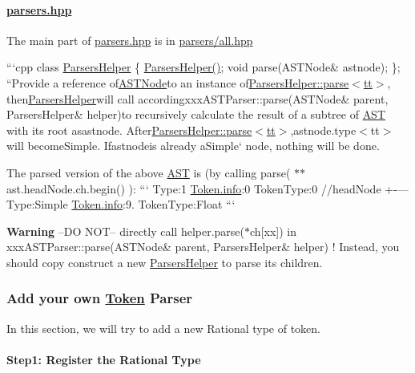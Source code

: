 \paragraph*{\hyperlink{parsers_8hpp}{parsers.\+hpp}}

The main part of {\ttfamily \hyperlink{parsers_8hpp}{parsers.\+hpp}} is in {\ttfamily \hyperlink{parsers_2all_8hpp}{parsers/all.\+hpp}}

```cpp class \hyperlink{class_parsers_helper}{Parsers\+Helper} \{ \hyperlink{class_parsers_helper}{Parsers\+Helper()}; void parse(\+A\+S\+T\+Node\& astnode); \}; ``{\ttfamily  Provide a reference of}\hyperlink{struct_a_s_t_node}{A\+S\+T\+Node}{\ttfamily to an instance of}\hyperlink{class_parsers_helper_aa3c66d731d1e5e762aedc61d36e97cc6}{Parsers\+Helper\+::parse$<$tt$>$}, then\hyperlink{class_parsers_helper}{Parsers\+Helper}{\ttfamily will call according}xxx\+A\+S\+T\+Parser\+::parse(\+A\+S\+T\+Node\& parent, Parsers\+Helper\& helper){\ttfamily to recursively calculate the result of a subtree of \hyperlink{class_a_s_t}{A\+S\+T} with its root as}astnode{\ttfamily . After}\hyperlink{class_parsers_helper_aa3c66d731d1e5e762aedc61d36e97cc6}{Parsers\+Helper\+::parse$<$tt$>$},astnode.\+type$<$tt$>$will becomeSimple{\ttfamily . If}astnode{\ttfamily is already a}Simple` node, nothing will be done.

The parsed version of the above \hyperlink{class_a_s_t}{A\+S\+T} is (by calling {\ttfamily parse( $\ast$$\ast$ast.head\+Node.\+ch.\+begin() )}\+: ``` Type\+:1 \hyperlink{struct_token_a4c338f6ca199f4a8575e877d36d03a06}{Token.\+info}\+:0 Token\+Type\+:0 //head\+Node +-\/---Type\+:Simple \hyperlink{struct_token_a4c338f6ca199f4a8575e877d36d03a06}{Token.\+info}\+:9. Token\+Type\+:Float ```

{\bfseries Warning} --D\+O N\+O\+T-- directly call {\ttfamily helper.\+parse($\ast$ch\mbox{[}xx\mbox{]})} in {\ttfamily xxx\+A\+S\+T\+Parser\+::parse(\+A\+S\+T\+Node\& parent, Parsers\+Helper\& helper)} ! Instead, you should copy construct a new {\ttfamily \hyperlink{class_parsers_helper}{Parsers\+Helper}} to parse its children.

\subsubsection*{Add your own \hyperlink{struct_token}{Token} Parser}

In this section, we will try to add a new {\ttfamily Rational} type of token.

\paragraph*{Step1\+: Register the Rational Type}

